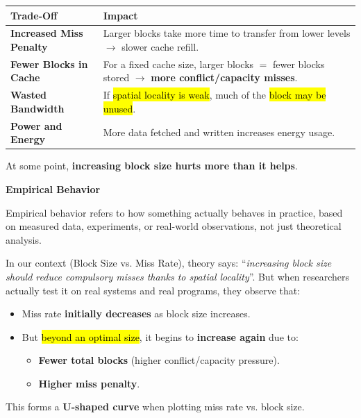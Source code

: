\begin{table}[!htp]
    \centering
    \begin{tabular}{@{} l p{20em} @{}}
        \toprule
        Trade-Off & Impact \\
        \midrule
        \textbf{Increased Miss Penalty}  & Larger blocks take more time to transfer from lower levels $\rightarrow$ slower cache refill.                        \\ [.3em]
        \textbf{Fewer Blocks in Cache}   & For a fixed cache size, larger blocks $=$ fewer blocks stored $\rightarrow$ \textbf{more conflict/capacity misses}.  \\ [.3em]
        \textbf{Wasted Bandwidth}        & If \hl{spatial locality is weak}, much of the \hl{block may be unused}.                                              \\ [.3em]
        \textbf{Power and Energy}        & More data fetched and written increases energy usage.                                                                \\
        \bottomrule
    \end{tabular}
\end{table}

\noindent
\textcolor{Red2}{} At some point, \textbf{increasing block size hurts more than it helps}.

\newpage
\begin{flushleft}
    \textcolor{Green3}{ \textbf{Empirical Behavior}}
\end{flushleft}
Empirical behavior refers to how something actually behaves in practice, based on measured data, experiments, or real-world observations, not just theoretical analysis.

\highspace
In our context (Block Size vs. Miss Rate), theory says: ``\emph{increasing block size should reduce compulsory misses thanks to spatial locality}''. But when researchers actually test it on real systems and real programs, they observe that:
\begin{itemize}
    \item Miss rate \textbf{initially decreases} as block size increases.
    \item But \hl{beyond an optimal size}, it begins to \textbf{increase again} due to:
    \begin{itemize}
        \item \textbf{Fewer total blocks} (higher conflict/capacity pressure).
        \item \textbf{Higher miss penalty}.
    \end{itemize}
\end{itemize}
This forms a \textbf{U-shaped curve} when plotting miss rate vs. block size.

